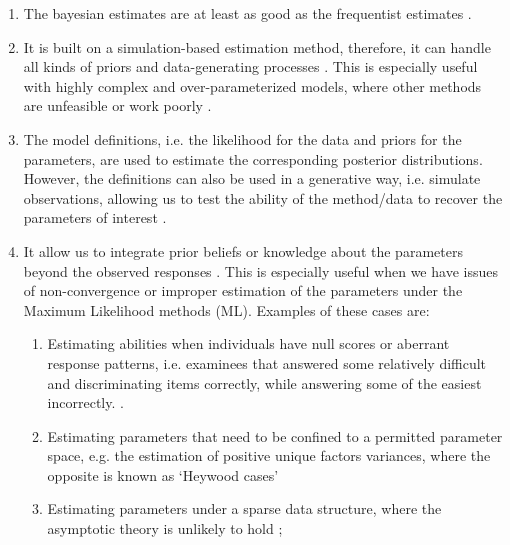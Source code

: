 \begin{enumerate}
	\item The bayesian estimates are at least as good as the frequentist estimates \cite{Baker_1998, Wollack_2002, Hsieh_2010}. 
	
	\item It is built on a simulation-based estimation method, therefore, it can handle all kinds of priors and data-generating processes \cite{Fox_2010}. This is especially useful with highly complex and over-parameterized models, where other methods are unfeasible or work poorly \cite{Baker_1998, Kim_1999}. 
	
	\item The model definitions, i.e. the likelihood for the data and priors for the parameters, are used to estimate the corresponding posterior distributions. However, the definitions can also be used in a generative way, i.e. simulate observations, allowing us to test the ability of the method/data to recover the parameters of interest \cite{McElreath_2020}.
	
	\item It allow us to integrate prior beliefs or knowledge about the parameters beyond the observed responses \cite{Fox_2010, Skrondal_et_al_2004a}. This is especially useful when we have issues of non-convergence or improper estimation of the parameters under the Maximum Likelihood methods (ML). Examples of these cases are:
	
	\begin{enumerate}
		\item Estimating abilities when individuals have null scores or aberrant response patterns, i.e. examinees that answered some relatively difficult and discriminating items correctly, while answering some of the easiest incorrectly. \cite{Hambleton_et_al_1991a, Azevedo_2003}.
		
		\item Estimating parameters that need to be confined to a permitted parameter space, e.g. the estimation of positive unique factors variances, where the opposite is known as ‘Heywood cases’ \cite{Martin_et_al_1975}
			
		\item Estimating parameters under a sparse data structure, where the asymptotic theory is unlikely to hold \cite{Fox_2010};
		
	\end{enumerate}
	
\end{enumerate}

